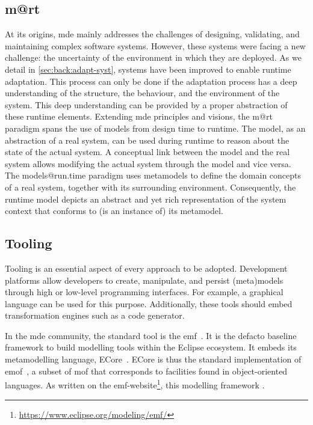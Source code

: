 \subsection[Models@run.time]{\Gls{m@rt}}
At its origins, \gls{mde} mainly addresses the challenges of designing, validating, and maintaining complex software systems.
However, these systems were facing a new challenge: the uncertainty of the environment in which they are deployed.
As we detail in \autoref{sec:back:adapt-syst}, systems have been improved to enable runtime adaptation.
This process can only be done if the adaptation process has a deep understanding of the structure, the behaviour, and the environment of the system.
This deep understanding can be provided by a proper abstraction of these runtime elements.
Extending \gls{mde} principles and visions, the \gls{m@rt} paradigm spans the use of \glspl{model} from design time to runtime.
The model, as an abstraction of a real system, can be used during runtime to reason about the state of the actual system. 
A conceptual link between the model and the real system allows modifying the actual system through the model and vice versa.
The models@run.time paradigm uses \glspl{metamodel} to define the domain concepts of a real system, together with its surrounding environment. 
Consequently, the runtime model depicts an abstract and yet rich representation of the system context that conforms to (is an instance of) its \gls{metamodel}.

\subsection{Tooling}
Tooling is an essential aspect of every approach to be adopted.
Development platforms allow developers to create, manipulate, and persist (meta)\glspl{model} through high or low-level programming interfaces.
For example, a graphical language can be used for this purpose.
Additionally, these tools should embed transformation engines such as a code generator.

In the \gls{mde} community, the standard tool is the \gls{emf}~\cite{steinberg2008emf}.
It is the defacto baseline framework to build modelling tools within the Eclipse ecosystem.
It embeds its metamodelling  language, ECore~\cite{steinberg2008emf, ECore:website}.
ECore is thus the standard implementation of \gls{emof}~\cite{MOF:Spec}, a subset of \gls{mof} that corresponds to facilities found in object-oriented languages.
As written on the \gls{emf}-website\footnote{\url{https://www.eclipse.org/modeling/emf/}}, this modelling framework . 

